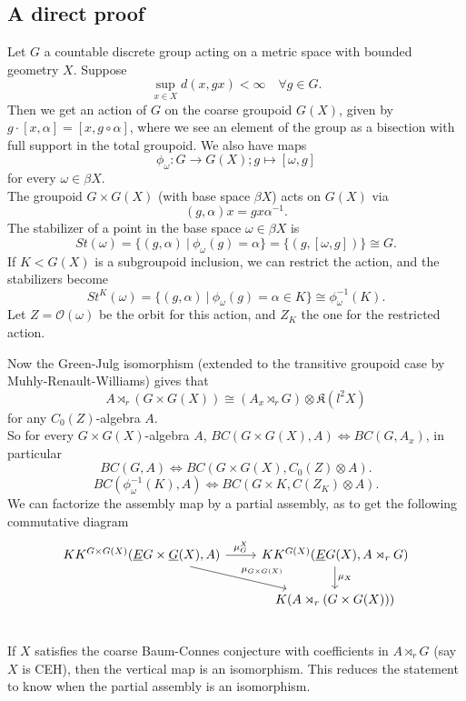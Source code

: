 \subsection{A direct proof}

Let $G$ a countable discrete group acting on a metric space with bounded geometry $X$. Suppose 
\[\sup_{x\in X} d(x,gx) <\infty \quad \forall g\in G.\]
Then we get an action of $G$ on the coarse groupoid $G(X)$, given by $g \cdot [x,\alpha] = [x, g\circ \alpha]$, where we see an element of the group as a bisection with full support in the total groupoid. We also have maps
\[\phi_\omega : G \rightarrow G(X) ; g \mapsto [\omega, g] \]
for every $\omega\in \beta X$.\\
The groupoid $G\times G(X)$ (with base space $\beta X$) acts on $G(X)$ via 
\[(g , \alpha)x = gx\alpha^{-1}.\]
The stabilizer of a point in the base space $\omega \in \beta X$ is 
\[St(\omega) = \{ (g,\alpha) \ | \ \phi_\omega(g)= \alpha\} = \{(g , [\omega, g])\} \cong G.\]
If $K<G(X)$ is a subgroupoid inclusion, we can restrict the action, and the stabilizers become
\[St^K(\omega) = \{ (g,\alpha) \ | \ \phi_\omega(g)= \alpha \in K\} \cong \phi_\omega^{-1}(K).\]
Let $Z= \mathcal O(\omega)$ be the orbit for this action, and $Z_K$ the one for the restricted action.
 
Now the Green-Julg isomorphism (extended to the transitive groupoid case by Muhly-Renault-Williams) gives that 
\[ A\rtimes_r (G\times G(X)) \cong (A_x \rtimes_r G) \otimes \mathfrak K(l^2 X)\]
for any $C_0(Z)$-algebra $A$.\\

So for every $G\times G(X)$-algebra $A$, $BC(G\times G(X) , A) \iff BC(G, A_x) $, in particular 
\[ BC(G, A ) \iff BC(G\times G(X) , C_0(Z)\otimes A).\]
\[ BC(\phi^{-1}_\omega(K), A ) \iff BC(G\times K , C(Z_K)\otimes A).\]
We can factorize the assembly map by a partial assembly, as to get the following commutative diagram
\[\begin{tikzcd}
KK^{G\times G(X)}(\underline E G\times \underline G(X), A ) \arrow{dr}{\mu_{G\times G(X)}}\arrow{r}{\mu_G^X } 
		& KK^{G(X)}(\underline E G(X), A\rtimes_r G ) 	\arrow{d}{\mu_X}\\
		& K(A\rtimes_r (G\times G(X))) \\ 
\end{tikzcd}\]
If $X$ satisfies the coarse Baum-Connes conjecture with coefficients in $A\rtimes_r G$ (say $X$ is CEH), then the vertical map is an isomorphism. This reduces the statement to know when the partial assembly is an isomorphism. \\


